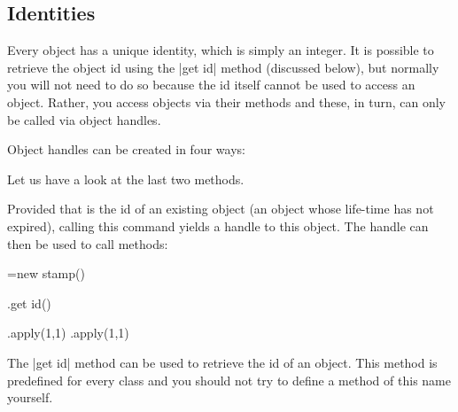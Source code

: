 \subsection{Identities}
\label{section-identities}

Every object has a unique identity, which is simply an integer. It is possible
to retrieve the object id using the |get id| method (discussed below), but
normally you will not need to do so because the id itself cannot be used to
access an object. Rather, you access objects via their methods and these, in
turn, can only be called via object handles.

Object handles can be created in four ways:
%

Let us have a look at the last two methods.

\begin{command}{\pgfooobj{}}
    Provided that  is the id of an existing object (an object whose
    life-time has not expired), calling this command yields a handle to this
    object. The handle can then be used to call methods:
\begin{codeexample}
\pgfoonew \mystamp=new stamp()

\mystamp.get id(\myid)

\mystamp.apply(1,1)
\pgfooobj{\myid}.apply(1,1)
\end{codeexample}
\end{command}

The |get id| method can be used to retrieve the id of an object. This method is
predefined for every class and you should not try to define a method of this
name yourself.

